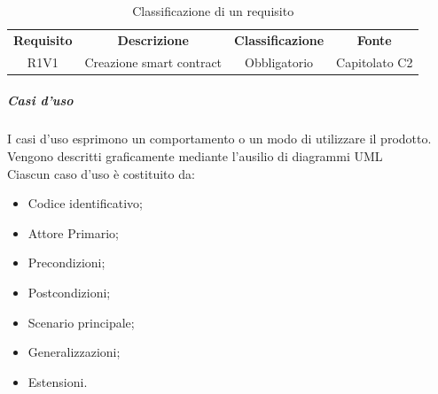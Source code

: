             \begin{table}[H]
              \centering
              \renewcommand{\arraystretch}{1.8}
              \begin{tabular}{cccc}
                \rowcolor[HTML]{125E28} 
                \color[HTML]{FFFFFF}\textbf{Requisito}
              & \color[HTML]{FFFFFF}\textbf{Descrizione} 
              & \color[HTML]{FFFFFF}\textbf{Classificazione} 
              & \color[HTML]{FFFFFF}\textbf{Fonte}\\
            
                R1V1  &  Creazione smart contract  &  Obbligatorio  &  Capitolato C2\\    
            
              \end{tabular}
              \caption{Classificazione di un requisito}
            \end{table}
                        
            \subparagraph{Casi d'uso} \label{subparagraph:Casi d'uso}
            I casi d'uso esprimono un comportamento o un modo di utilizzare il prodotto.\\
            Vengono descritti graficamente mediante l'ausilio di diagrammi UML\glo{}\\
            Ciascun caso d'uso è costituito da:
            \begin{itemize}
                \item Codice identificativo;
                \item Attore Primario;
                \item Precondizioni;
                \item Postcondizioni;
                \item Scenario principale;
                \item Generalizzazioni;
                \item Estensioni.
            \end{itemize}

